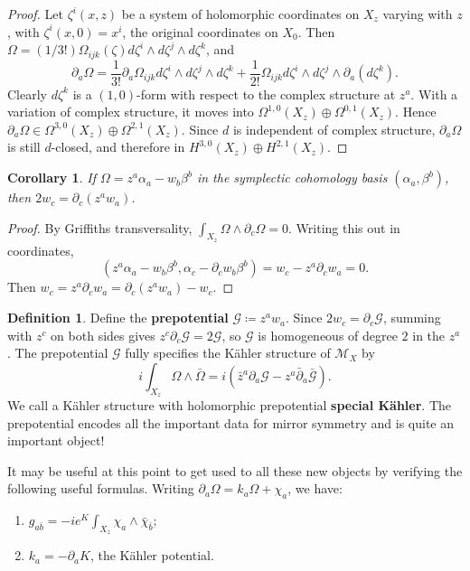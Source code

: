 \documentclass{report}
\theoremstyle{plain}
\newtheorem{corollary}[theorem]{Corollary}
\theoremstyle{definition}
\newtheorem{definition}[theorem]{Definition}
\theoremstyle{remark}
\newcommand{\di}{\partial}
\newcommand{\cG}{\mathcal{G}}
\newcommand{\cM}{\mathcal{M}}
\newcommand{\bz}{\bar{z}}
\newcommand{\bdi}{\bar{\di}}
\begin{document}
\begin{proof}
  Let $\zeta^i(x, z)$ be a system of holomorphic coordinates on $X_z$
  varying with $z$, with $\zeta^i(x, 0) = x^i$, the original
  coordinates on $X_0$. Then $\Omega = (1/3!) \Omega_{ijk}(\zeta)
  d\zeta^i \wedge d\zeta^j \wedge d\zeta^k$, and
  \[ \di_a\Omega = \frac{1}{3!} \di_a \Omega_{ijk} d\zeta^i \wedge d\zeta^j \wedge d\zeta^k + \frac{1}{2!} \Omega_{ijk} d\zeta^i \wedge d\zeta^j \wedge \di_a(d\zeta^k). \]
  Clearly $d\zeta^k$ is a $(1,0)$-form with respect to the complex
  structure at $z^a$. With a variation of complex structure, it moves
  into $\Omega^{1,0}(X_z) \oplus \Omega^{0,1}(X_z)$. Hence
  $\di_a\Omega \in \Omega^{3,0}(X_z) \oplus \Omega^{2,1}(X_z)$. Since
  $d$ is independent of complex structure, $\di_a\Omega$ is still
  $d$-closed, and therefore in $H^{3,0}(X_z) \oplus H^{2,1}(X_z)$.
\end{proof}

\begin{corollary}
  If $\Omega = z^a \alpha_a - w_b \beta^b$ in the symplectic
  cohomology basis $(\alpha_a, \beta^b)$, then $2w_c = \di_c(z^a
  w_a)$.
\end{corollary}

\begin{proof}
  By Griffiths transversality, $\int_{X_z} \Omega \wedge \di_c\Omega =
  0$. Writing this out in coordinates,
  \[ (z^a \alpha_a - w_b \beta^b, \alpha_c - \di_c w_b \beta^b) = w_c - z^a \di_c w_a = 0. \]
  Then $w_c = z^a \di_c w_a = \di_c(z^a w_a) - w_c$.
\end{proof}

\begin{definition}
  Define the {\bf prepotential} $\cG \coloneqq z^aw_a$. Since $2w_c =
  \di_c\cG$, summing with $z^c$ on both sides gives $z^c \di_c \cG =
  2\cG$, so $\cG$ is homogeneous of degree $2$ in the $z^a$. The
  prepotential $\cG$ fully specifies the K\"ahler structure of $\cM_X$
  by
  \[ i \int_{X_z} \Omega \wedge \bar{\Omega} = i(\bz^a \di_a \cG - z^a \bdi_a \bar{\cG}). \]
  We call a K\"ahler structure with holomorphic prepotential {\bf
    special K\"ahler}. The prepotential encodes all the important data
  for mirror symmetry and is quite an important object!
\end{definition}

It may be useful at this point to get used to all these new objects by
verifying the following useful formulas. Writing $\di_a\Omega = k_a
\Omega + \chi_a$, we have:
\begin{enumerate}
\item $g_{a\bar{b}} = -ie^K \int_{X_z} \chi_a \wedge \bar{\chi}_{\bar{b}}$;
\item $k_a = -\di_a K$, the K\"ahler potential.
\end{enumerate}
\end{document}
